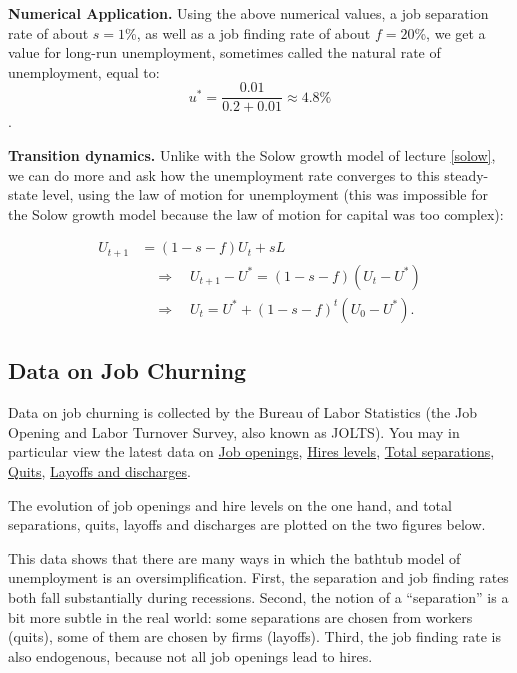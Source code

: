 \documentclass[]{book}
\begin{document}
\textbf{Numerical Application.} Using the above numerical values, a job
separation rate of about \(s=1\)\%, as well as a job finding rate of
about \(f=20\)\%, we get a value for long-run unemployment, sometimes
called the natural rate of unemployment, equal to:
\[u^{*}=\frac{0.01}{0.2 + 0.01}\approx 4.8\%\].

\textbf{Transition dynamics.} Unlike with the Solow growth model of
lecture \ref{solow}, we can do more and ask how the unemployment rate
converges to this steady-state level, using the law of motion for
unemployment (this was impossible for the Solow growth model because the
law of motion for capital was too complex):

\[
\begin{aligned}
U_{t+1}&=\left(1-s-f\right)U_{t}+sL\\
& \quad\Rightarrow\quad U_{t+1}-U^{*}=\left(1-s-f\right)\left(U_{t}-U^{*}\right)\\
    & \quad\Rightarrow\quad U_{t}=U^{*}+\left(1-s-f\right)^{t}\left(U_{0}-U^{*}\right).
\end{aligned}
\]

\subsection{Data on Job Churning}\label{data-on-job-churning}

Data on job churning is collected by the Bureau of Labor Statistics (the
Job Opening and Labor Turnover Survey, also known as JOLTS). You may in
particular view the latest data on
\href{https://www.bls.gov/news.release/jolts.t01.htm}{Job openings},
\href{https://www.bls.gov/news.release/jolts.t02.htm}{Hires levels},
\href{https://www.bls.gov/news.release/jolts.t03.htm}{Total
separations},
\href{https://www.bls.gov/news.release/jolts.t04.htm}{Quits},
\href{https://www.bls.gov/news.release/jolts.t05.htm}{Layoffs and
discharges}.

The evolution of job openings and hire levels on the one hand, and total
separations, quits, layoffs and discharges are plotted on the two
figures below.

This data shows that there are many ways in which the bathtub model of
unemployment is an oversimplification. First, the separation and job
finding rates both fall substantially during recessions. Second, the
notion of a ``separation'' is a bit more subtle in the real world: some
separations are chosen from workers (quits), some of them are chosen by
firms (layoffs). Third, the job finding rate is also endogenous, because
not all job openings lead to hires.
\end{document}
